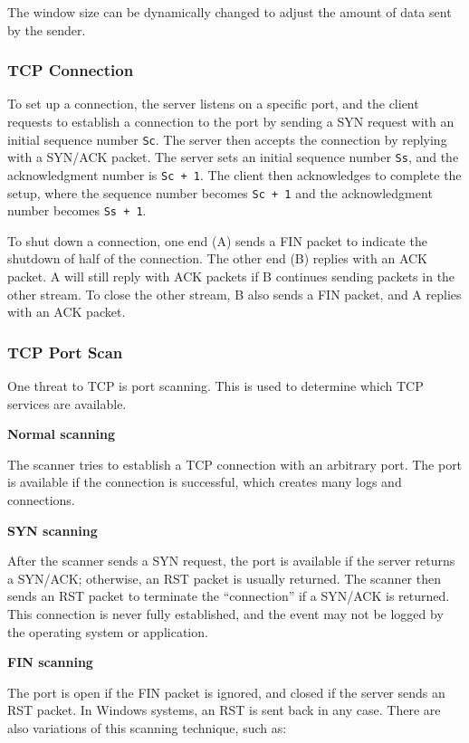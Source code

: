 The window size can be dynamically changed to adjust the amount of data sent by the sender. 

\subsubsection{TCP Connection}
To set up a connection, the server listens on a specific port, and the client requests to establish a connection to the port by sending a SYN request with an initial sequence number \texttt{Sc}. The server then accepts the connection by replying with a SYN/ACK packet. The server sets an initial sequence number \texttt{Ss}, and the acknowledgment number is \texttt{Sc + 1}. The client then acknowledges to complete the setup, where the sequence number becomes \texttt{Sc + 1} and the acknowledgment number becomes \texttt{Ss + 1}.  

To shut down a connection, one end (A) sends a FIN packet to indicate the shutdown of half of the connection. The other end (B) replies with an ACK packet. A will still reply with ACK packets if B continues sending packets in the other stream. To close the other stream, B also sends a FIN packet, and A replies with an ACK packet.  

\subsubsection{TCP Port Scan}
One threat to TCP is port scanning. This is used to determine which TCP services are available.  

\textbf{Normal scanning}  

The scanner tries to establish a TCP connection with an arbitrary port. The port is available if the connection is successful, which creates many logs and connections.  

\textbf{SYN scanning}  

After the scanner sends a SYN request, the port is available if the server returns a SYN/ACK; otherwise, an RST packet is usually returned. The scanner then sends an RST packet to terminate the ``connection'' if a SYN/ACK is returned. This connection is never fully established, and the event may not be logged by the operating system or application.  

\textbf{FIN scanning}  

The port is open if the FIN packet is ignored, and closed if the server sends an RST packet. In Windows systems, an RST is sent back in any case. There are also variations of this scanning technique, such as:

